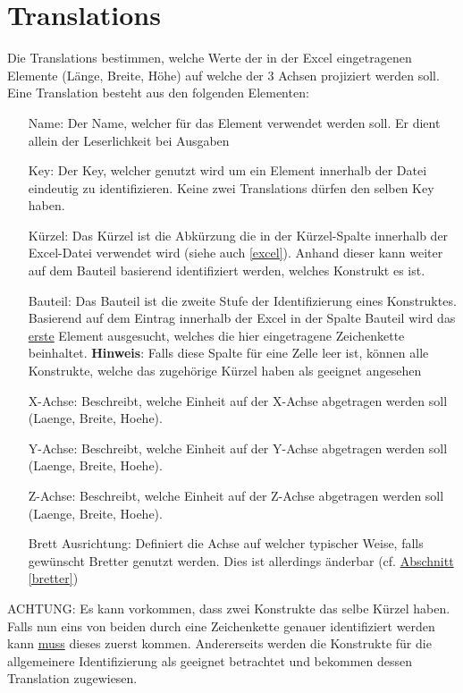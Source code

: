 \documentclass{book}
\newcommand{\hinweis}[1]{\newline \textbf{Hinweis}: #1 \newline}
\newcommand{\red}[1]{\color{red}#1\color{black}\xspace}
\begin{document}
		\section{Translations} \label{Translation}
			Die Translations bestimmen, welche Werte der in der Excel eingetragenen Elemente (Länge, Breite, Höhe) auf welche der 3 Achsen projiziert werden soll. Eine Translation besteht aus den folgenden Elementen:
			\begin{itemize}
				\setlength{\itemindent}{1cm}
				\item[Name:] Der Name, welcher für das Element verwendet werden soll. Er dient allein der Leserlichkeit bei Ausgaben
				\item[Key:] Der Key, welcher genutzt wird um ein Element innerhalb der Datei eindeutig zu identifizieren. Keine zwei Translations dürfen den selben Key haben.
				\item[Kürzel:] Das Kürzel ist die Abkürzung die in der \glqq Kürzel\grqq -Spalte innerhalb der Excel-Datei verwendet wird (siehe auch \hyperref[excel]{\ref{excel}}). Anhand dieser kann weiter auf dem Bauteil basierend identifiziert werden, welches Konstrukt es ist.
				\item[Bauteil:] Das Bauteil ist die zweite Stufe der Identifizierung eines Konstruktes. Basierend auf dem Eintrag innerhalb der Excel in der Spalte \glqq Bauteil \grqq wird das \underline{erste} Element ausgesucht, welches die hier eingetragene Zeichenkette beinhaltet.
				\hinweis{Falls diese Spalte für eine Zelle leer ist, können alle Konstrukte, welche das zugehörige Kürzel haben als geeignet angesehen}
				\item[X-Achse:] Beschreibt, welche Einheit auf der X-Achse abgetragen werden soll (Laenge, Breite, Hoehe).
				\item[Y-Achse:] Beschreibt, welche Einheit auf der Y-Achse abgetragen werden soll (Laenge, Breite, Hoehe).
				\item[Z-Achse:] Beschreibt, welche Einheit auf der Z-Achse abgetragen werden soll (Laenge, Breite, Hoehe).
				\item[Brett Ausrichtung:] Definiert die Achse auf welcher typischer Weise, falls gewünscht Bretter genutzt werden. Dies ist allerdings änderbar (cf. \hyperref[bretter]{Abschnitt \ref{bretter}})
			\end{itemize}
		
			\red{ACHTUNG}: Es kann vorkommen, dass zwei Konstrukte das selbe Kürzel haben. Falls nun eins von beiden durch eine Zeichenkette genauer identifiziert werden kann \underline{muss} dieses zuerst kommen. Andererseits werden die Konstrukte für die allgemeinere Identifizierung als geeignet betrachtet und bekommen dessen Translation zugewiesen.\\
			
\end{document}
